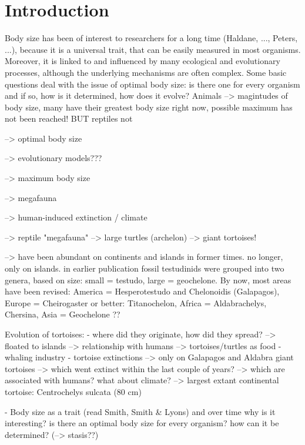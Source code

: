 \section{Introduction}

Body size has been of interest to researchers for a long time (Haldane, ..., Peters, ...), because it is a universal trait, that can be easily measured in most organisms. Moreover, it is linked to and influenced by many ecological and evolutionary processes, although the underlying mechanisms are often complex. 
Some basic questions deal with the issue of optimal body size: is there one for every organism and if so, how is it determined, how does it evolve?
Animals --> magintudes of body size, many have their greatest body size right now, possible maximum has not been reached! BUT reptiles not

--> optimal body size

--> evolutionary models???

--> maximum body size 

--> megafauna 

--> human-induced extinction / climate

--> reptile "megafauna" --> large turtles (archelon) --> giant tortoises!

--> have been abundant on continents and islands in former times. no longer, only on islands.
in earlier publication fossil testudinids were grouped into two genera, based on size: small = testudo, large = geochelone. 
By now, most areas have been revised: America = Hesperotestudo and Chelonoidis (Galapagos), Europe = Cheirogaster or better: Titanochelon, Africa = Aldabrachelys, Chersina, Asia = Geochelone ??

Evolution of tortoises:
- where did they originate, how did they spread?
--> floated to islands
--> relationship with humans --> tortoises/turtles as food - whaling industry
- tortoise extinctions --> only on Galapagos and Aldabra giant tortoises --> which went extinct within the last couple of years? --> which are associated with humans?
what about climate?
--> largest extant continental tortoise: Centrochelys sulcata (80 cm)






- Body size as a trait (read Smith, Smith \& Lyons) and over time
why is it interesting?
is there an optimal body size for every organism? how can it be determined? (--> stasis??)

